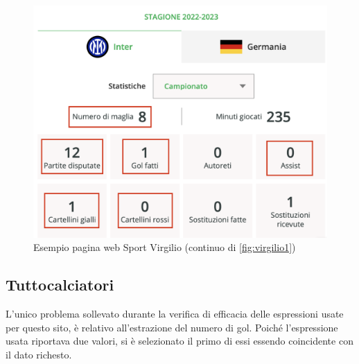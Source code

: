 \begin{figure}
    \centering
    \includegraphics[scale=0.4]{img/virgilio2.png}
    \caption{Esempio pagina web Sport Virgilio (continuo di \ref{fig:virgilio1})}
    \label{fig:virgilio2}
\end{figure}

\subsection{Tuttocalciatori}
L'unico problema sollevato durante la verifica di efficacia delle espressioni usate per questo sito, è relativo all'estrazione del numero di gol. Poiché l'espressione usata riportava due valori, si è selezionato il primo di essi essendo coincidente con il dato richesto. 

